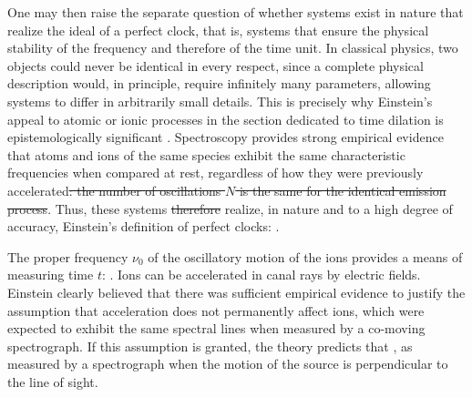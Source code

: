 \documentclass[submitted,12pt]{article} %
\providecommand{\DIFdel}[1]{{\protect\color{red}\sout{#1}}}                      %
\providecommand{\DIFdelbegin}{} %
\providecommand{\DIFdelend}{} %
\begin{document}
One may then raise the separate question of whether systems exist in nature that realize the ideal of a perfect clock, that is, systems that ensure the physical stability of the frequency and therefore of the time unit. In classical physics, two objects could never be identical in every respect, since a complete physical description would, in principle, require infinitely many parameters, allowing systems to differ in arbitrarily small details. This is precisely why Einstein’s appeal to atomic or ionic processes in the section dedicated to time dilation is epistemologically significant \citep{Pierseaux2003}. Spectroscopy provides strong empirical evidence that atoms and ions of the same species exhibit the same characteristic frequencies when compared at rest, regardless of how they were previously accelerated\DIFdelbegin \DIFdel{: the number of oscillations $N$ is the same for the identical emission process}\DIFdelend . Thus, these systems \DIFdelbegin \DIFdel{therefore }\DIFdelend realize, in nature and to a high degree of accuracy, Einstein's definition of perfect clocks:  \citep[132\psq]{Einstein1910}.

The proper frequency $\nu_0$ of the oscillatory motion of the ions provides a means of measuring time $t$:  \citep[133]{Einstein1910}. Ions can be accelerated in canal rays by electric fields. Einstein clearly believed that there was sufficient empirical evidence to justify the assumption that acceleration does not permanently affect ions, which were expected to exhibit the same spectral lines when measured by a co-moving spectrograph. If this assumption is granted, the theory predicts that  \citep[133\me]{Einstein1910}, as measured by a spectrograph when the motion of the source is perpendicular to the line of sight.
\end{document}
